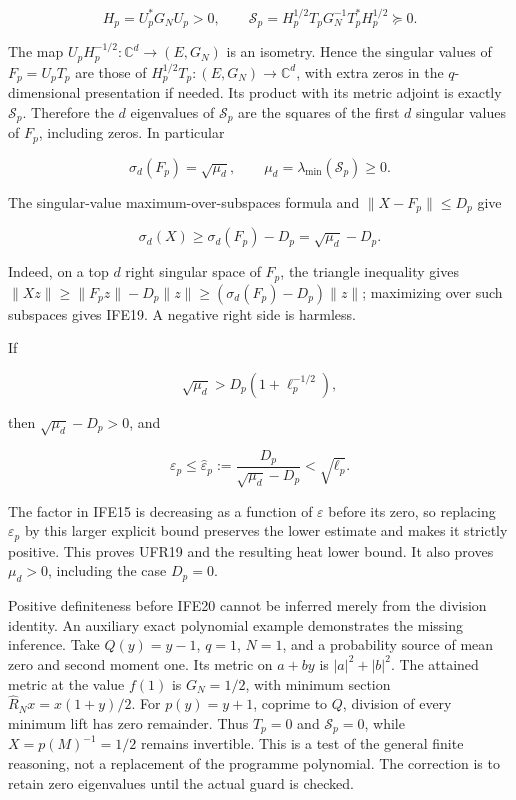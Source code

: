 \documentclass[11pt]{article}
\begin{document}
\[
H_p=U_p^*G_NU_p>0,\qquad
\mathcal S_p=H_p^{1/2}T_pG_N^{-1}T_p^*H_p^{1/2}\succeq0.
\tag{IFE17}
\]

The map \(U_pH_p^{-1/2}:\mathbb C^d\to(E,G_N)\) is an isometry. Hence the singular values of \(F_p=U_pT_p\) are those of \(H_p^{1/2}T_p:(E,G_N)\to\mathbb C^d\), with extra zeros in the \(q\)-dimensional presentation if needed. Its product with its metric adjoint is exactly \(\mathcal S_p\). Therefore the \(d\) eigenvalues of \(\mathcal S_p\) are the squares of the first \(d\) singular values of \(F_p\), including zeros. In particular

\[
\sigma_d(F_p)=\sqrt{\mu_d},\qquad
\mu_d=\lambda_{\min}(\mathcal S_p)\ge0.
\tag{IFE18}
\]

The singular-value maximum-over-subspaces formula and \(\|X-F_p\|\le D_p\) give

\[
\sigma_d(X)\ge\sigma_d(F_p)-D_p=\sqrt{\mu_d}-D_p.
\tag{IFE19}
\]

Indeed, on a top \(d\) right singular space of \(F_p\), the triangle inequality gives \(\|Xz\|\ge\|F_pz\|-D_p\|z\|\ge(\sigma_d(F_p)-D_p)\|z\|\); maximizing over such subspaces gives IFE19. A negative right side is harmless.

If

\[
\boxed{\sqrt{\mu_d}>D_p(1+\ell_p^{-1/2}),}
\tag{IFE20}
\]

then \(\sqrt{\mu_d}-D_p>0\), and

\[
\varepsilon_p\le
\widehat\varepsilon_p:=\frac{D_p}{\sqrt{\mu_d}-D_p}
<\sqrt{\ell_p}.
\tag{IFE21}
\]

The factor in IFE15 is decreasing as a function of \(\varepsilon\) before its zero, so replacing \(\varepsilon_p\) by this larger explicit bound preserves the lower estimate and makes it strictly positive. This proves UFR19 and the resulting heat lower bound. It also proves \(\mu_d>0\), including the case \(D_p=0\).

Positive definiteness before IFE20 cannot be inferred merely from the division identity. An auxiliary exact polynomial example demonstrates the missing inference. Take \(Q(y)=y-1\), \(q=1\), \(N=1\), and a probability source of mean zero and second moment one. Its metric on \(a+by\) is \(|a|^2+|b|^2\). The attained metric at the value \(f(1)\) is \(G_N=1/2\), with minimum section \(\widehat R_Nx=x(1+y)/2\). For \(p(y)=y+1\), coprime to \(Q\), division of every minimum lift has zero remainder. Thus \(T_p=0\) and \(\mathcal S_p=0\), while \(X=p(M)^{-1}=1/2\) remains invertible. This is a test of the general finite reasoning, not a replacement of the programme polynomial. The correction is to retain zero eigenvalues until the actual guard is checked.
\end{document}

